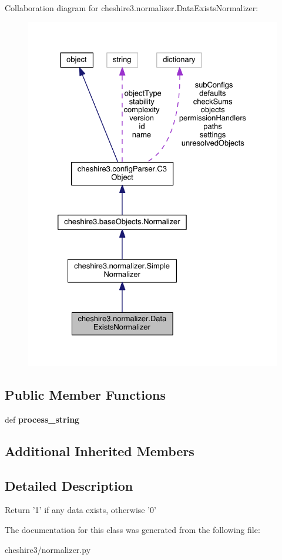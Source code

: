 Collaboration diagram for cheshire3.\-normalizer.\-Data\-Exists\-Normalizer\-:
\nopagebreak
\begin{figure}[H]
\begin{center}
\leavevmode
\includegraphics[width=328pt]{classcheshire3_1_1normalizer_1_1_data_exists_normalizer__coll__graph}
\end{center}
\end{figure}
\subsection*{Public Member Functions}
\begin{DoxyCompactItemize}
\item 
\hypertarget{classcheshire3_1_1normalizer_1_1_data_exists_normalizer_a4b491e59766d898831b2cf408c3c4345}{def {\bfseries process\-\_\-string}}\label{classcheshire3_1_1normalizer_1_1_data_exists_normalizer_a4b491e59766d898831b2cf408c3c4345}

\end{DoxyCompactItemize}
\subsection*{Additional Inherited Members}


\subsection{Detailed Description}
\begin{DoxyVerb}Return '1' if any data exists, otherwise '0' \end{DoxyVerb}
 

The documentation for this class was generated from the following file\-:\begin{DoxyCompactItemize}
\item 
cheshire3/normalizer.\-py\end{DoxyCompactItemize}
